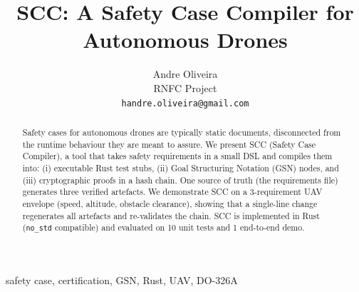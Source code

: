 ﻿\documentclass[conference]{IEEEtran}
\title{SCC: A Safety Case Compiler for Autonomous Drones}
\author{Andre Oliveira\\RNFC Project\\\texttt{handre.oliveira@gmail.com}}
\begin{document}
\maketitle

\begin{abstract}
Safety cases for autonomous drones are typically static documents,
disconnected from the runtime behaviour they are meant to assure.
We present SCC (Safety Case Compiler), a tool that takes safety
requirements in a small DSL and compiles them into: (i) executable
Rust test stubs, (ii) Goal Structuring Notation (GSN) nodes, and
(iii) cryptographic proofs in a hash chain. One source of truth
(the requirements file) generates three verified artefacts. We
demonstrate SCC on a 3-requirement UAV envelope (speed, altitude,
obstacle clearance), showing that a single-line change regenerates
all artefacts and re-validates the chain. SCC is implemented in
Rust (\texttt{no\_std} compatible) and evaluated on 10 unit tests
and 1 end-to-end demo.
\end{abstract}

\begin{IEEEkeywords}
safety case, certification, GSN, Rust, UAV, DO-326A
\end{IEEEkeywords}









\end{document}
